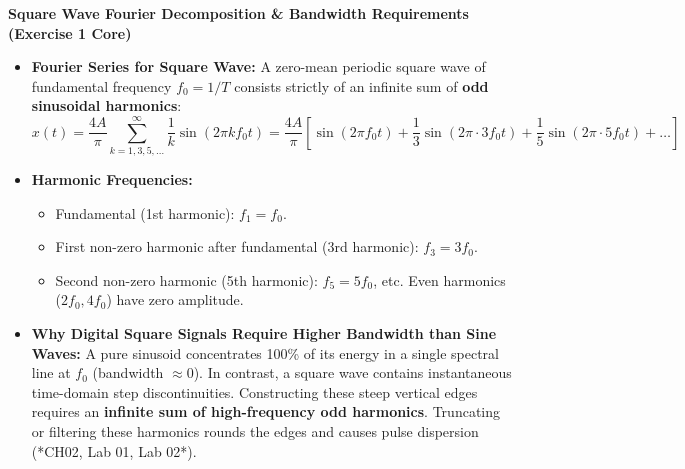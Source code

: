 \documentclass[10pt,a4paper]{article}
\begin{document}
\noindent\textbf{\color{themeblue}Square Wave Fourier Decomposition \& Bandwidth Requirements (Exercise 1 Core)}
\begin{itemize}[leftmargin=12pt, itemsep=1.5pt, topsep=1pt]
    \item \textbf{Fourier Series for Square Wave:} A zero-mean periodic square wave of fundamental frequency $f_0 = 1/T$ consists strictly of an infinite sum of \textbf{odd sinusoidal harmonics}:
    \begin{equation}
        x(t) = \frac{4A}{\pi} \sum_{k=1, 3, 5, \dots}^{\infty} \frac{1}{k} \sin(2\pi k f_0 t) = \frac{4A}{\pi} \left[ \sin(2\pi f_0 t) + \frac{1}{3}\sin(2\pi \cdot 3f_0 t) + \frac{1}{5}\sin(2\pi \cdot 5f_0 t) + \dots \right]
    \end{equation}
    \item \textbf{Harmonic Frequencies:} 
    \begin{itemize}[leftmargin=10pt, itemsep=0.5pt]
        \item Fundamental (1st harmonic): $f_1 = f_0$.
        \item First non-zero harmonic after fundamental (3rd harmonic): $f_3 = 3f_0$.
        \item Second non-zero harmonic (5th harmonic): $f_5 = 5f_0$, etc. Even harmonics ($2f_0, 4f_0$) have zero amplitude.
    \end{itemize}
    \item \textbf{Why Digital Square Signals Require Higher Bandwidth than Sine Waves:} A pure sinusoid concentrates 100\% of its energy in a single spectral line at $f_0$ (bandwidth $\approx 0$). In contrast, a square wave contains instantaneous time-domain step discontinuities. Constructing these steep vertical edges requires an \textbf{infinite sum of high-frequency odd harmonics}. Truncating or filtering these harmonics rounds the edges and causes pulse dispersion (*CH02, Lab 01, Lab 02*).
\end{itemize}

\vspace{1pt}
\end{document}
